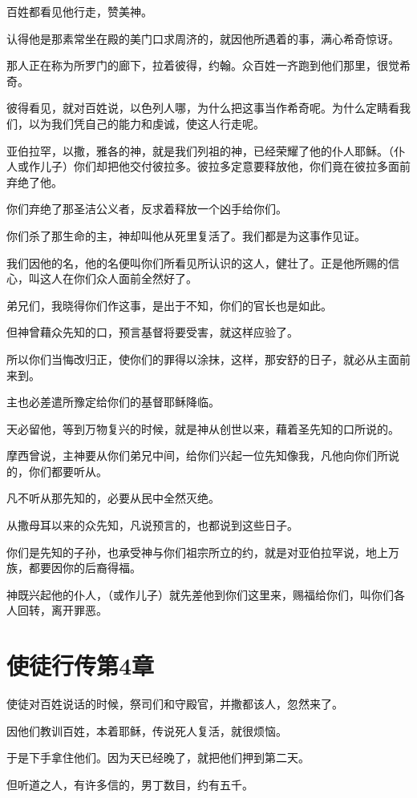 \documentclass[12pt,oneside]{book}
\begin{document}
百姓都看见他行走，赞美神。

认得他是那素常坐在殿的美门口求周济的，就因他所遇着的事，满心希奇惊讶。

那人正在称为所罗门的廊下，拉着彼得，约翰。众百姓一齐跑到他们那里，很觉希奇。

彼得看见，就对百姓说，以色列人哪，为什么把这事当作希奇呢。为什么定睛看我们，以为我们凭自己的能力和虔诚，使这人行走呢。

亚伯拉罕，以撒，雅各的神，就是我们列祖的神，已经荣耀了他的仆人耶稣。（仆人或作儿子）你们却把他交付彼拉多。彼拉多定意要释放他，你们竟在彼拉多面前弃绝了他。

你们弃绝了那圣洁公义者，反求着释放一个凶手给你们。

你们杀了那生命的主，神却叫他从死里复活了。我们都是为这事作见证。

我们因他的名，他的名便叫你们所看见所认识的这人，健壮了。正是他所赐的信心，叫这人在你们众人面前全然好了。

弟兄们，我晓得你们作这事，是出于不知，你们的官长也是如此。

但神曾藉众先知的口，预言基督将要受害，就这样应验了。

所以你们当悔改归正，使你们的罪得以涂抹，这样，那安舒的日子，就必从主面前来到。

主也必差遣所豫定给你们的基督耶稣降临。

天必留他，等到万物复兴的时候，就是神从创世以来，藉着圣先知的口所说的。

摩西曾说，主神要从你们弟兄中间，给你们兴起一位先知像我，凡他向你们所说的，你们都要听从。

凡不听从那先知的，必要从民中全然灭绝。

从撒母耳以来的众先知，凡说预言的，也都说到这些日子。

你们是先知的子孙，也承受神与你们祖宗所立的约，就是对亚伯拉罕说，地上万族，都要因你的后裔得福。

神既兴起他的仆人，（或作儿子）就先差他到你们这里来，赐福给你们，叫你们各人回转，离开罪恶。

\chapter{使徒行传第4章}
使徒对百姓说话的时候，祭司们和守殿官，并撒都该人，忽然来了。

因他们教训百姓，本着耶稣，传说死人复活，就很烦恼。

于是下手拿住他们。因为天已经晚了，就把他们押到第二天。

但听道之人，有许多信的，男丁数目，约有五千。
\end{document}
